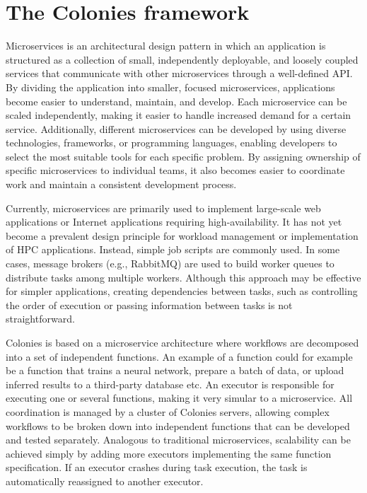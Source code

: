 \documentclass{article}
\begin{document}
\section{The Colonies framework}
\label{sec:headings}
Microservices is an architectural design pattern in which an application is structured as a collection of small, independently deployable, and loosely coupled services that communicate with other microservices through a well-defined API. By dividing the application into smaller, focused microservices, applications become easier to understand, maintain, and develop. Each microservice can be scaled independently, making it easier to handle increased demand for a certain service. Additionally, different microservices can be developed by using diverse technologies, frameworks, or programming languages, enabling developers to select the most suitable tools for each specific problem. By assigning ownership of specific microservices to individual teams, it also becomes easier to coordinate work and maintain a consistent development process.

Currently, microservices are primarily used to implement large-scale web applications or Internet applications requiring high-availability. It has not yet become a prevalent design principle for workload management or implementation of HPC applications. Instead, simple job scripts are commonly used. In some cases, message brokers (e.g., RabbitMQ) are used to build worker queues to distribute tasks among multiple workers. Although this approach may be effective for simpler applications, creating dependencies between tasks, such as controlling the order of execution or passing information between tasks is not straightforward.

Colonies is based on a microservice architecture where workflows are decomposed into a set of independent functions. An example of a function could for example be a function that trains a neural network, prepare a batch of data, or upload inferred results to a third-party database etc. An executor is responsible for executing one or several functions, making it very simular to a microservice. All coordination is managed by a cluster of Colonies servers, allowing complex workflows to be broken down into independent functions that can be developed and tested separately. Analogous to traditional microservices, scalability can be achieved simply by adding more executors implementing the same function specification. If an executor crashes during task execution, the task is automatically reassigned to another executor. 
\end{document}
